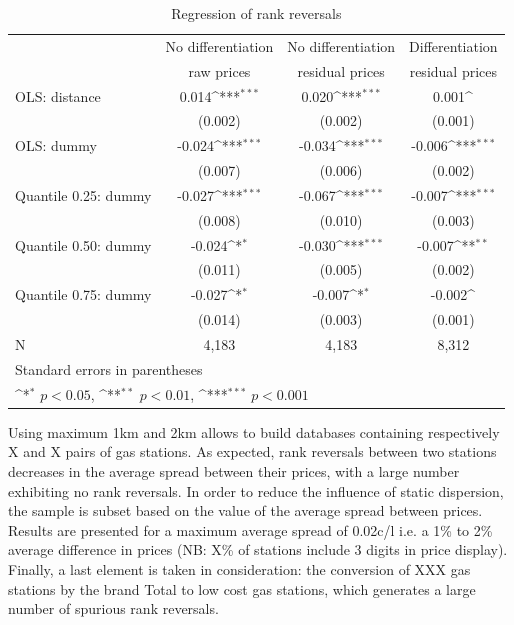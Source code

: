 \documentclass[11pt]{article}
\begin{document}
\begin{table}[htbp]\centering
\def\sym#1{\ifmmode^{#1}\else\(^{#1}\)\fi}
\caption{Regression of rank reversals}
\begin{tabular}{lccc}
\hline
\hline
{} & No differentiation & No differentiation & Differentiation \\
{} & raw prices & residual prices & residual prices \\
\hline
OLS: distance             &  0.014\sym{***}  &  0.020\sym{***}  &  0.001\sym{}\\
{}                        & (0.002)          & (0.002)          & (0.001)   \\
OLS: dummy                & -0.024\sym{***}  & -0.034\sym{***}  & -0.006\sym{***}\\
{}                        & (0.007)          & (0.006)          & (0.002) \\
Quantile 0.25: dummy      & -0.027\sym{***}  & -0.067\sym{***}  & -0.007\sym{***}\\
{}                        & (0.008)          & (0.010)          & (0.003)  \\
Quantile 0.50: dummy      & -0.024\sym{*}    & -0.030\sym{***}  & -0.007\sym{**}\\
{}                        & (0.011)          & (0.005)          & (0.002)    \\
Quantile 0.75: dummy      & -0.027\sym{*}    & -0.007\sym{*}    & -0.002\sym{}\\
{}                        & (0.014)          & (0.003)          & (0.001)   \\
\hline
N                         & 4,183            &   4,183          &     8,312    \\
\hline\hline
\multicolumn{4}{l}{\footnotesize Standard errors in parentheses}\\
\multicolumn{4}{l}{\footnotesize \sym{*} \(p<0.05\), \sym{**} \(p<0.01\), \sym{***} \(p<0.001\)}\\
\end{tabular}
\end{table}

Using maximum 1km and 2km allows to build databases containing respectively X and X pairs of gas stations. As expected, rank reversals between two stations decreases in the average spread between their prices, with a large number exhibiting no rank reversals. In order to reduce the influence of static dispersion, the sample is subset based on the value of the average spread between prices. Results are presented for a maximum average spread of 0.02c/l i.e. a 1\% to 2\% average difference in prices (NB: X\% of stations include 3 digits in price display). Finally, a last element is taken in consideration: the conversion of XXX gas stations by the brand Total to low cost gas stations, which generates a large number of spurious rank reversals.
\end{document}
